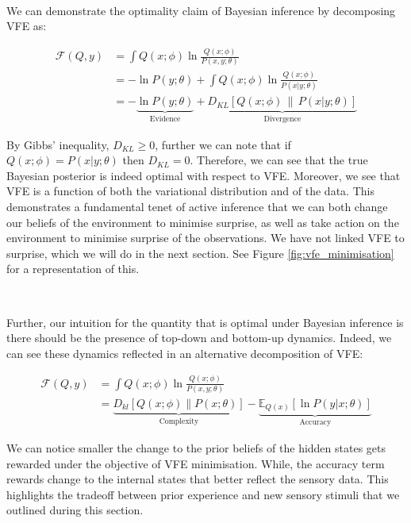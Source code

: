 \documentclass{article}
\begin{document}
\

We can demonstrate the optimality claim of Bayesian inference by decomposing VFE as: 

\begin{equation}\label{eq:vfe_low_road}
	\begin{aligned}
		\mathcal{F}(Q, y) &=  \int Q(x; \phi) \ln \frac{Q(x; \phi)}{P(x, y; \theta)} \\
		&= - \ln P(y; \theta) + \int Q(x; \phi) \ln \frac{Q(x; \phi)}{P(x | y; \theta)} \\ 
		&= - \underbrace{\ln P(y; \theta)}_{\text{Evidence}} + \underbrace{D_{KL}\left[ Q(x; \phi) \,\|\, P(x | y; \theta) \right]}_{\text{Divergence}}
	\end{aligned}
\end{equation}

By Gibbs' inequality, $D_{KL} \geq 0 $, further we can note that if $Q(x; \phi) = P(x | y; \theta)$ then $D_{KL} = 0$. Therefore, we can see that the true Bayesian posterior is indeed optimal with respect to VFE. Moreover, we see that VFE is a function of both the variational distribution and of the data. This demonstrates a fundamental tenet of active inference that we can both change our beliefs of the environment to minimise surprise, as well as take action on the environment to minimise surprise of the observations. We have not linked VFE to surprise, which we will do in the next section. See Figure \ref{fig:vfe_minimisation} for a representation of this. 

\

Further, our intuition for the quantity that is optimal under Bayesian inference is there should be the presence of top-down and bottom-up dynamics. Indeed, we can see these dynamics reflected in an alternative decomposition of VFE:

\begin{equation}
\begin{aligned}
	\mathcal{F}(Q, y) &=  \int Q(x; \phi) \ln \frac{Q(x; \phi)}{P(x, y; \theta)} \\ 
	&= \underbrace{D_{kl}\left[ Q(x; \phi) \| P(x; \theta)  \right]}_{\text{Complexity}} - \underbrace{\mathbb{E}_{Q(x)}\left[ \ln P(y | x; \theta) \right]}_{\text{Accuracy}}
\end{aligned}
\end{equation}

We can notice smaller the change to the prior beliefs of the hidden states gets rewarded under the objective of VFE minimisation. While, the accuracy term rewards change to the internal states that better reflect the sensory data. This highlights the tradeoff between prior experience and new sensory stimuli that we outlined during this section.
\end{document}
